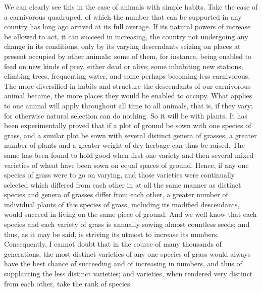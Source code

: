 \darwinpair
{We can clearly see this in the case of animals with simple habits. Take the case of a carnivorous quadruped, of which the number that can be supported in any country has long ago arrived at its full average. If its natural powers of increase be allowed to act, it can succeed in increasing, the country not undergoing any change in its conditions, only by its varying descendants seizing on places at present occupied by other animals: some of them, for instance, being enabled to feed on new kinds of prey, either dead or alive; some inhabiting new stations, climbing trees, frequenting water, and some perhaps becoming less carnivorous. The more diversified in habits and structure the descendants of our carnivorous animal became, the more places they would be enabled to occupy. What applies to one animal will apply throughout all time to all animals, that is, if they vary; for otherwise natural selection can do nothing. So it will be with plants. It has been experimentally proved that if a plot of ground be sown with one species of grass, and a similar plot be sown with several distinct genera of grasses, a greater number of plants and a greater weight of dry herbage can thus be raised. The same has been found to hold good when first one variety and then several mixed varieties of wheat have been sown on equal spaces of ground. Hence, if any one species of grass were to go on varying, and those varieties were continually selected which differed from each other in at all the same manner as distinct species and genera of grasses differ from each other, a greater number of individual plants of this species of grass, including its modified descendants, would succeed in living on the same piece of ground. And we well know that each species and each variety of grass is annually sowing almost countless seeds; and thus, as it may be said, is striving its utmost to increase its numbers. Consequently, I cannot doubt that in the course of many thousands of generations, the most distinct varieties of any one species of grass would always have the best chance of succeeding and of increasing in numbers, and thus of supplanting the less distinct varieties; and varieties, when rendered very distinct from each other, take the rank of species.}
